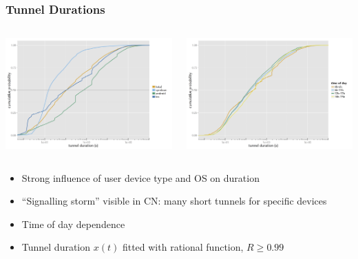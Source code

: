 \documentclass{beamer}
\begin{document}
\begin{frame}
	\frametitle{Tunnel Durations}

	\begin{columns}[T]
			\includegraphics[width=\columnwidth]{extras/R-tunnel-duration-operating-system.png}

			\includegraphics[width=\columnwidth]{extras/R-duration-timeofday-ecdf.png}
	\end{columns}

	\begin{itemize}
		\item Strong influence of user device type and OS on duration
		\item ``Signalling storm'' visible in CN: many short tunnels for specific devices
		\item Time of day dependence
		\item Tunnel duration $x(t)$ fitted with rational function, $R \geq 0.99$
	\end{itemize}
\end{frame}
\end{document}
